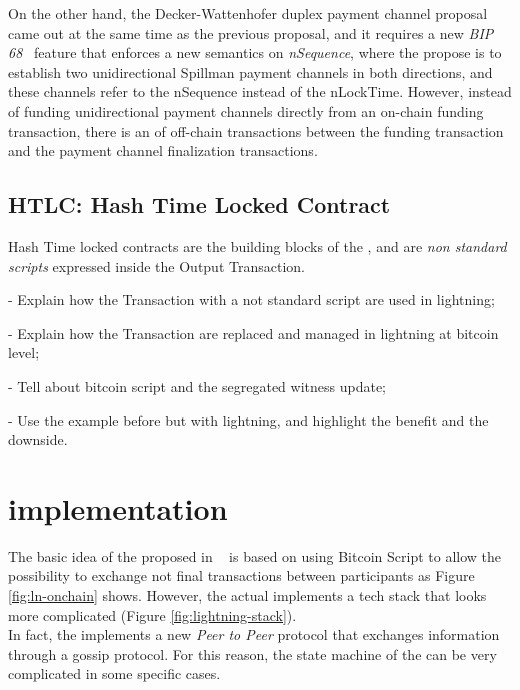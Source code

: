 On the other hand, the Decker-Wattenhofer duplex payment channel proposal came out at the same time as the previous proposal, and
it requires a new \emph{BIP 68}~\cite{bip68} feature that enforces a new semantics on \emph{nSequence}, where the propose is to
establish two unidirectional Spillman payment channels in both
directions, and these channels refer to the nSequence instead of the nLockTime.
However, instead of funding unidirectional payment channels directly from an on-chain funding transaction, there is 
an  of off-chain transactions between the funding transaction and the payment channel finalization transactions.

\subsection{HTLC: Hash Time Locked Contract}
\label{sec:htlc_intro}

Hash Time locked contracts are the building blocks of the {\LN},
and are \emph{non standard scripts} expressed inside the Output Transaction. 


- Explain how the Transaction with a not standard script are used in lightning;

- Explain how the Transaction are replaced and managed in lightning at bitcoin level;

- Tell about bitcoin script and the segregated witness update;

- Use the example before but with lightning, and highlight the benefit and the downside.

\section{{\LN} implementation}

The basic idea of the {\LN} proposed in ~\cite{lightning-network-paper} is based on using Bitcoin Script
to allow the possibility to exchange not final transactions between participants as Figure \ref{fig:ln-onchain} shows.
However, the actual {\LN} implements a tech stack that looks more complicated (Figure \ref{fig:lightning-stack}).\\
In fact, the {\LN} implements a new \emph{Peer to Peer} protocol that exchanges information through
a gossip protocol. For this reason, the state machine of the {\LN}
can be very complicated in some specific cases.

